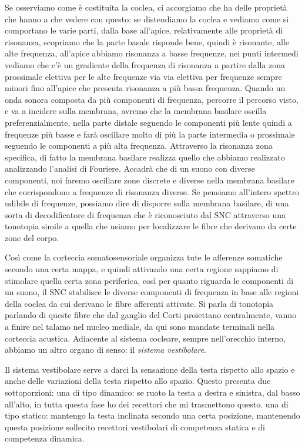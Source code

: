 \documentclass[a4paper,12pt]{article}
\begin{document}
Se osserviamo come è costituita la coclea, ci accorgiamo che ha delle proprietà che hanno a che vedere con questo: se distendiamo la coclea e vediamo come si comportano le varie parti, dalla base all'apice, relativamente alle proprietà di risonanza, scopriamo che la parte basale risponde bene, quindi è risonante, alle alte frequenza, all'apice abbiamo risonanza a basse frequenze, nei punti intermedi vediamo che c'è un gradiente della frequenza di risonanza a partire dalla  zona prossimale elettiva per le alte frequenze via via elettiva per frequenze sempre minori fino all'apice che presenta risonanza a più bassa frequenza. Quando un onda sonora composta da più componenti di frequenza, percorre il percorso visto, e va a incidere sulla membrana, avremo che la membrana basilare oscilla preferenzialmente, nella parte distale seguendo le componenti più lente quindi a frequenze più basse e farà oscillare molto di più la parte intermedia o prossimale seguendo le componenti a più alta frequenza. Attraverso la risonanza zona specifica, di fatto la membrana basilare realizza quello che abbiamo realizzato analizzando l'analisi di Fouriere. Accadrà che di un suono con diverse componenti, noi faremo oscillare zone discrete e diverse nella membrana basilare che corrispondono a frequenze di risonanza diverse.  Se pensiamo all'intero spettro udibile di frequenze, possiamo dire di disporre sulla membrana basilare, di una sorta di decodificatore di frequenza che è riconosciuto dal SNC attraverso una tonotopia simile a quella che usiamo per localizzare le fibre che derivano da certe zone del corpo.

Così come la corteccia somatosensoriale organizza tute le afferenze somatiche secondo una certa mappa, e quindi attivando una certa regione sappiamo di stimolare quella certa zona periferica, così per quanto riguarda le componenti di un suono, il SNC stabilisce le diverse componenti di frequenza in base alle regioni della coclea da cui derivano le fibre afferenti attivate. Si parla di tonotopia parlando di queste fibre che dal ganglio del Corti proiettano centralmente, vanno a finire nel talamo nel nucleo mediale, da qui sono mandate terminali nella corteccia acustica. 
Adiacente al sistema cocleare, sempre nell'orecchio interno, abbiamo un altro organo di senso: il \emph{sistema vestibolare}.

Il sistema vestibolare serve a darci la sensazione della testa rispetto allo spazio e anche delle variazioni della testa rispetto allo spazio. Questo presenta due sottoporzioni:
una di tipo dinamico: se ruoto la testa a destra e sinistra, dal basso all'alto, in tutta questa fase ho dei recettori che mi trasmettono questo.
una di tipo statico: mantengo la testa inclinata secondo una certa posizione, mantenendo questa posizione sollecito recettori vestibolari di competenza statica e di competenza dinamica. 
\end{document}

